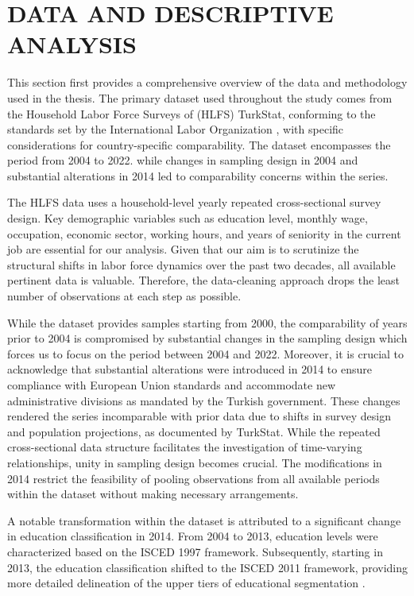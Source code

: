 \section{DATA AND DESCRIPTIVE ANALYSIS }

\begin{onehalfspace}
This section first provides a comprehensive overview of the data and
methodology used in the thesis. The primary dataset used throughout
the study comes from the Household Labor Force Surveys of (HLFS) TurkStat,
conforming to the standards set by the International Labor Organization
\citeyearpar{ILO2012}, with specific considerations for country-specific
comparability. The dataset encompasses the period from 2004 to 2022.
while changes in sampling design in 2004 and substantial alterations
in 2014 led to comparability concerns within the series.

The HLFS data uses a household-level yearly repeated cross-sectional
survey design. Key demographic variables such as education level,
monthly wage, occupation, economic sector, working hours, and years
of seniority in the current job are essential for our analysis. Given
that our aim is to scrutinize the structural shifts in labor force
dynamics over the past two decades, all available pertinent data is
valuable. Therefore, the data-cleaning approach drops the least number
of observations at each step as possible.

While the dataset provides samples starting from 2000, the comparability
of years prior to 2004 is compromised by substantial changes in the
sampling design which forces us to focus on the period between 2004
and 2022. Moreover, it is crucial to acknowledge that substantial
alterations were introduced in 2014 to ensure compliance with European
Union standards and accommodate new administrative divisions as mandated
by the Turkish government. These changes rendered the series incomparable
with prior data due to shifts in survey design and population projections,
as documented by TurkStat. While the repeated cross-sectional data
structure facilitates the investigation of time-varying relationships,
unity in sampling design becomes crucial. The modifications in 2014
restrict the feasibility of pooling observations from all available
periods within the dataset without making necessary arrangements.

A notable transformation within the dataset is attributed to a significant
change in education classification in 2014. From 2004 to 2013, education
levels were characterized based on the ISCED 1997 framework. Subsequently,
starting in 2013, the education classification shifted to the ISCED
2011 framework, providing more detailed delineation of the upper tiers
of educational segmentation \citep{OECD2015}.


\end{onehalfspace}
